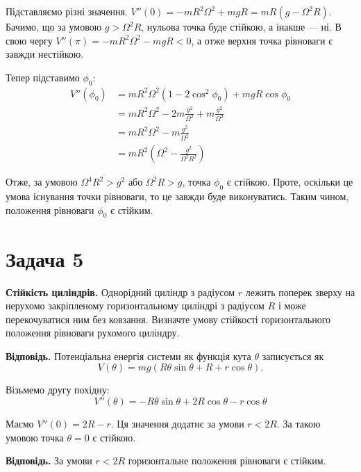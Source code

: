\documentclass{hw_template}
\begin{document}
Підставляємо різні значення. $V''(0) = -mR^2\Omega^2 + mgR = mR(g-\Omega^2 R)$. Бачимо, 
що за умовою $g>\Omega^2 R$, нульова точка буде стійкою, а інакше --- ні. В свою чергу
$V''(\pi) = -mR^2\Omega^2 - mgR < 0$, а отже верхня точка рівноваги є завжди нестійкою.

Тепер підставимо $\phi_0$:
\begin{align*}
    V''(\phi_0) &= mR^2\Omega^2(1 - 2\cos^2\phi_0) + mgR \cos \phi_0 \\
    &= mR^2\Omega^2 - 2m\frac{g^2}{\Omega^2} + m\frac{g^2}{\Omega^2} \\
    &= mR^2\Omega^2 - m\frac{g^2}{\Omega^2} \\
    &= mR^2\left(\Omega^2 - \frac{g^2}{\Omega^2R^2}\right)
\end{align*}

Отже, за умовою $\Omega^4R^2>g^2$ або $\Omega^2R>g$, точка $\phi_0$ є стійкою. Проте,
оскільки це умова існування точки рівноваги, то це завжди буде виконуватись. Таким чином,
положення рівноваги $\phi_0$ є стійким.

\section{Задача 5}

\begin{problem}
    \textbf{Стійкість циліндрів.} Однорідний циліндр з радіусом $r$ лежить поперек
зверху на нерухомо закріпленому горизонтальному циліндрі з радіусом $R$ і
може перекочуватися ним без ковзання. Визначте умову стійкості
горизонтального положення рівноваги рухомого циліндру.
\end{problem}

\textbf{Відповідь.} Потенціальна енергія системи як функція кута $\theta$
записується як 
\begin{equation*}
    V(\theta)=mg(R\theta\sin\theta + R + r \cos\theta).    
\end{equation*}
 
Візьмемо другу похідну:
\begin{equation*}
    V''(\theta) = -R\theta\sin\theta + 2R\cos\theta - r\cos\theta
\end{equation*}

Маємо $V''(0) = 2R-r$. Ця значення додатнє за умови $r<2R$. За такою 
умовою точка $\theta=0$ є стійкою. 

\textbf{Відповідь.} За умови $r<2R$ горизонтальне положення рівноваги є стійким.
\end{document}
